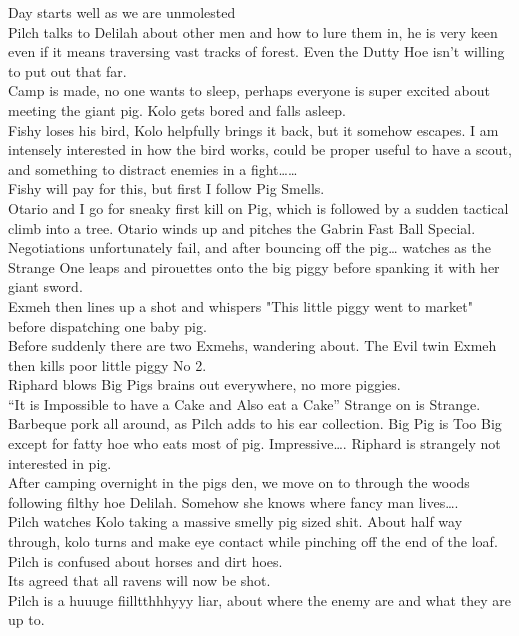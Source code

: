Day starts well as we are unmolested\\
Pilch talks to Delilah about other men and how to lure them in, he is very keen even if it means traversing vast tracks of forest. Even the Dutty Hoe isn’t willing to put out that far.\\
Camp is made, no one wants to sleep, perhaps everyone is super excited about meeting the giant pig. Kolo gets bored and falls asleep.\\
Fishy loses his bird, Kolo helpfully brings it back, but it somehow escapes. I am intensely interested in how the bird works, could be proper useful to have a scout, and something to distract enemies in a fight……\\
Fishy will pay for this, but first I follow Pig Smells.\\
Otario and I go for sneaky first kill on Pig, which is followed by a sudden tactical climb into a tree. Otario winds up and pitches the Gabrin Fast Ball Special. Negotiations unfortunately fail, and after bouncing off the pig… watches as the Strange One leaps and pirouettes onto the big piggy before spanking it with her giant sword.\\
Exmeh then lines up a shot and whispers "This little piggy went to market" before dispatching one baby pig.\\
Before suddenly there are two Exmehs, wandering about. The Evil twin Exmeh then kills poor little piggy No 2.\\
Riphard blows Big Pigs brains out everywhere, no more piggies.\\
“It is Impossible to have a Cake and Also eat a Cake” Strange on is Strange.\\
Barbeque pork all around, as Pilch adds to his ear collection. Big Pig is Too Big except for fatty hoe who eats most of pig. Impressive…. Riphard is strangely not interested in pig.\\
After camping overnight in the pigs den, we move on to through the woods following filthy hoe Delilah. Somehow she knows where fancy man lives….\\
Pilch watches Kolo taking a massive smelly pig sized shit. About half way through, kolo turns and make eye contact while pinching off the end of the loaf.\\
Pilch is confused about horses and dirt hoes.\\
Its agreed that all ravens will now be shot.\\
Pilch is a huuuge fiilltthhhyyy liar, about where the enemy are and what they are up to.\\
